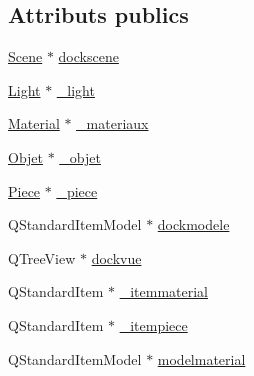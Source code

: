 \subsection*{Attributs publics}
\begin{DoxyCompactItemize}
\item 
\hyperlink{class_scene}{Scene} $\ast$ \hyperlink{class_mondock_ac6fd15f2143e05b554f3f936e6f1588f}{dockscene}
\item 
\hyperlink{class_light}{Light} $\ast$ \hyperlink{class_mondock_a541a241aadaf9820926b427f2d504573}{\+\_\+light}
\item 
\hyperlink{class_material}{Material} $\ast$ \hyperlink{class_mondock_ada15f5ec6dabb8728651472f5cc867a8}{\+\_\+materiaux}
\item 
\hyperlink{class_objet}{Objet} $\ast$ \hyperlink{class_mondock_a6325a3fb92643c99815b1a8025f7d401}{\+\_\+objet}
\item 
\hyperlink{class_piece}{Piece} $\ast$ \hyperlink{class_mondock_a8a9c524e7a781e45219699b15b20596f}{\+\_\+piece}
\item 
Q\+Standard\+Item\+Model $\ast$ \hyperlink{class_mondock_a3f46e1710907a9aedf250fce4ba93076}{dockmodele}
\item 
Q\+Tree\+View $\ast$ \hyperlink{class_mondock_a32e24e3ef7312fbd292740e19c3d3dcd}{dockvue}
\item 
Q\+Standard\+Item $\ast$ \hyperlink{class_mondock_ab873f19cf3a771dcb0f32480e3ea2c69}{\+\_\+itemmaterial}
\item 
Q\+Standard\+Item $\ast$ \hyperlink{class_mondock_a3de76b6bfaee199ee945f04c3c2f4c02}{\+\_\+itempiece}
\item 
Q\+Standard\+Item\+Model $\ast$ \hyperlink{class_mondock_aceda9fef8d2c8b9c88672bacbeac7988}{modelmaterial}
\end{DoxyCompactItemize}
